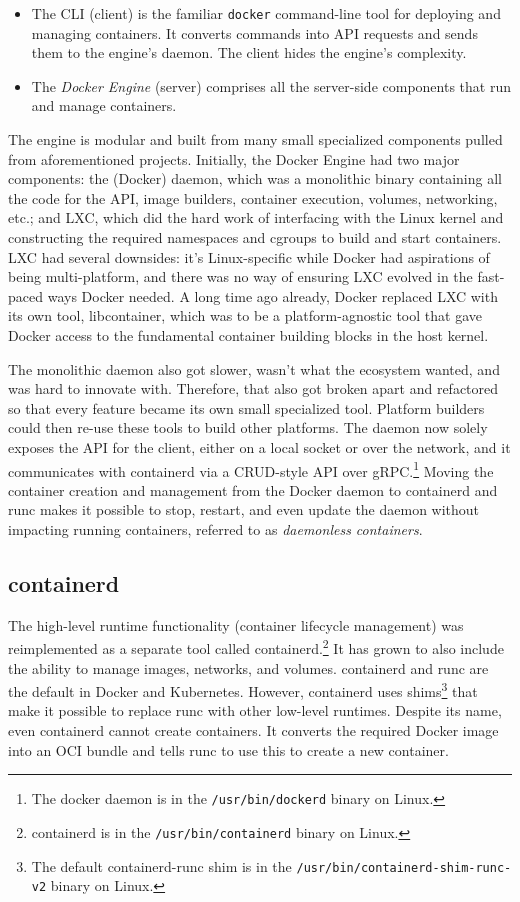 \documentclass[table, xcdraw]{article}%
\begin{document}
\begin{itemize}
    \item The CLI (client) is the familiar \texttt{docker} command-line tool for deploying and managing containers. It converts commands into API requests and sends them to the engine's daemon. The client hides the engine's complexity.
    \item The \emph{Docker Engine} (server) comprises all the server-side components that run and manage containers.
\end{itemize}

The engine is modular and built from many small specialized components pulled from aforementioned projects. Initially, the Docker Engine had two major components: the (Docker) daemon, which was a monolithic binary containing all the code for the API, image builders, container execution, volumes, networking, etc.; and LXC, which did the hard work of interfacing with the Linux kernel and constructing the required namespaces and cgroups to build and start containers. LXC had several downsides: it's Linux-specific while Docker had aspirations of being multi-platform, and there was no way of ensuring LXC evolved in the fast-paced ways Docker needed. A long time ago already, Docker replaced LXC with its own tool, libcontainer, which was to be a platform-agnostic tool that gave Docker access to the fundamental container building blocks in the host kernel.

The monolithic daemon also got slower, wasn’t what the ecosystem wanted, and was hard to innovate with. Therefore, that also got broken apart and refactored so that every feature became its own small specialized tool. Platform builders could then re-use these tools to build other platforms. The daemon now solely exposes the API for the client, either on a local socket or over the network, and it communicates with containerd via a CRUD-style API over gRPC.\footnote{The docker daemon is in the \texttt{/usr/bin/dockerd} binary on Linux.} Moving the container creation and management from the Docker daemon to containerd and runc makes it possible to stop, restart, and even update the daemon without impacting running containers, referred to as \emph{daemonless containers}.

\subsection{containerd}

The high-level runtime functionality (container lifecycle management) was reimplemented as a separate tool called containerd.\footnote{containerd is in the \texttt{/usr/bin/containerd} binary on Linux.} It has grown to also include the ability to manage images, networks, and volumes. containerd and runc are the default in Docker and Kubernetes. However, containerd uses shims\footnote{The default containerd-runc shim is in the \texttt{/usr/bin/containerd-shim-runc-v2} binary on Linux.} that make it possible to replace runc with other low-level runtimes. Despite its name, even containerd cannot create containers. It converts the required Docker image into an OCI bundle and tells runc to use this to create a new container.
\end{document}

